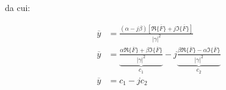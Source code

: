 \documentclass[11pt,italian]{article}
\theoremstyle{remark}
\begin{document}
da cui:

\begin{align*}
    \overline{y} & = \frac{(\alpha - j \beta ) \left[ \Re \{\overline{F}\} + j \Im \{\overline{F}\} \right]}{|\gamma|^2}                                                                                                 \\
    \overline{y} & = \underbrace{\frac{\alpha \Re \{\overline{F}\} + \beta \Im \{\overline{F}\} }{|\gamma|^2}}_{c_1} - j \underbrace{\frac{\beta \Re \{\overline{F}\} - \alpha \Im \{\overline{F}\} }{|\gamma|^2}}_{c_2} \\
    \overline{y} & = c_1 - j c_2                                                                                                                                                                                         \\
\end{align*}

\newpage
\end{document}
